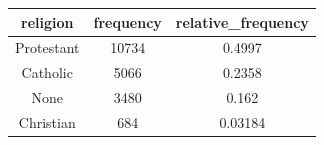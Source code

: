 \documentclass[]{tufte-book}
\begin{document}
\begin{longtable}[]{@{}ccc@{}}
\toprule
\begin{minipage}[b]{0.33\columnwidth}\centering\strut
religion\strut
\end{minipage} & \begin{minipage}[b]{0.15\columnwidth}\centering\strut
frequency\strut
\end{minipage} & \begin{minipage}[b]{0.25\columnwidth}\centering\strut
relative\_frequency\strut
\end{minipage}\tabularnewline
\midrule
\endhead
\begin{minipage}[t]{0.33\columnwidth}\centering\strut
Protestant\strut
\end{minipage} & \begin{minipage}[t]{0.15\columnwidth}\centering\strut
10734\strut
\end{minipage} & \begin{minipage}[t]{0.25\columnwidth}\centering\strut
0.4997\strut
\end{minipage}\tabularnewline
\begin{minipage}[t]{0.33\columnwidth}\centering\strut
Catholic\strut
\end{minipage} & \begin{minipage}[t]{0.15\columnwidth}\centering\strut
5066\strut
\end{minipage} & \begin{minipage}[t]{0.25\columnwidth}\centering\strut
0.2358\strut
\end{minipage}\tabularnewline
\begin{minipage}[t]{0.33\columnwidth}\centering\strut
None\strut
\end{minipage} & \begin{minipage}[t]{0.15\columnwidth}\centering\strut
3480\strut
\end{minipage} & \begin{minipage}[t]{0.25\columnwidth}\centering\strut
0.162\strut
\end{minipage}\tabularnewline
\begin{minipage}[t]{0.33\columnwidth}\centering\strut
Christian\strut
\end{minipage} & \begin{minipage}[t]{0.15\columnwidth}\centering\strut
684\strut
\end{minipage} & \begin{minipage}[t]{0.25\columnwidth}\centering\strut
0.03184\strut
\end{minipage}\tabularnewline

\end{longtable}
\end{document}
